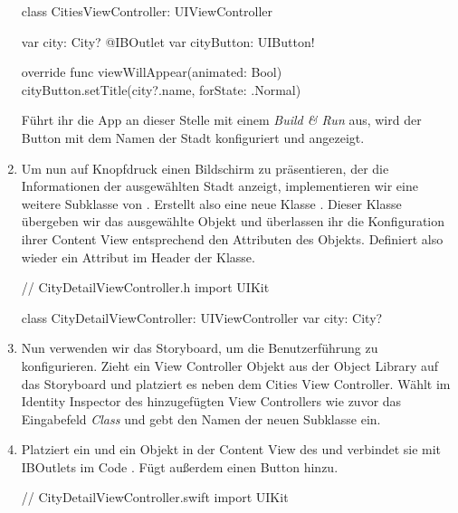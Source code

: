 \documentclass[parskip=half, final]{scrreprt}
\begin{document}
\begin{lecture}
\begin{enumerate}
\begin{swiftcode}
class CitiesViewController: UIViewController {
    var city: City?
    @IBOutlet var cityButton: UIButton!
    
    override func viewWillAppear(animated: Bool) {
        cityButton.setTitle(city?.name, forState: .Normal)
    }
}

\end{swiftcode}

Führt ihr die App an dieser Stelle mit einem \emph{Build \& Run} aus, wird der Button mit dem Namen der Stadt konfiguriert und angezeigt.

\item Um nun auf Knopfdruck einen Bildschirm zu präsentieren, der die Informationen der ausgewählten Stadt anzeigt, implementieren wir eine weitere Subklasse von . Erstellt also eine neue Klasse . Dieser Klasse übergeben wir das ausgewählte  Objekt und überlassen ihr die Konfiguration ihrer Content View entsprechend den Attributen des Objekts. Definiert also wieder ein Attribut  im Header der  Klasse.

\begin{swiftcode}
// CityDetailViewController.h
import UIKit

class CityDetailViewController: UIViewController {
    var city: City?
}
\end{swiftcode}

\item Nun verwenden wir das Storyboard, um die Benutzerführung zu konfigurieren. Zieht ein View Controller Objekt aus der Object Library auf das Storyboard und platziert es neben dem Cities View Controller. Wählt im Identity Inspector des hinzugefügten View Controllers wie zuvor das Eingabefeld \emph{Class} und gebt den Namen der neuen  Subklasse  ein.

\item Platziert ein  und ein  Objekt in der Content View des  und verbindet sie mit IBOutlets im Code . Fügt außerdem einen  Button hinzu.


\begin{swiftcode}
// CityDetailViewController.swift
import UIKit


\end{swiftcode}
\end{enumerate}
\end{lecture}
\end{document}
